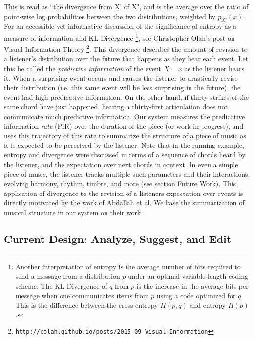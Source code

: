 \documentclass[final,authoryear,5p,times,twocolumn]{elsarticle}
\begin{document}
\noindent This is read as ``the divergence from X' of X", and is the average over the ratio of point-wise log probabilities between the two distributions, weighted by $p_{X'}(x)$. For an accessible yet informative discussion of the significance of entropy as a measure of information and KL Divergence  \footnote{Another interpretation of entropy is the average number of bits required to send a message from a distribution $p$ under an optimal variable-length coding scheme. The KL Divergence of $q$ from $p$ is the increase in the average bits per message when one communicates items from $p$ using a code optimized for $q$. This is the difference between the cross entropy $H(p,q)$ and entropy $H(p)$.}, see Christopher Olah's post on Visual Information Theory \footnote{\texttt{http://colah.github.io/posts/2015-09-Visual-Information}}. This divergence describes the amount of revision to a listener's distribution over the future that happens as they hear each event. Let this be called the \textit{predictive information} of the event $X=x$ as the listener hears it. When a surprising event occurs and causes the listener to drastically revise their distribution (i.e. this same event will be less surprising in the future), the event had high predicative information. On the other hand, if thirty strikes of the same chord have just happened, hearing a thirty-first articulation does not communicate much predictive information. Our system measures the predicative information \textit{rate} (PIR) over the duration of the piece (or work-in-progress), and uses this trajectory of this rate to summarize the structure of a piece of music as it is expected to be perceived by the listener. Note that in the running example, entropy and divergence were discussed in terms of a sequence of chords heard by the listener, and the expectation over next chords in context. In even a simple piece of music, the listener tracks multiple such parameters and their interactions: evolving harmony, rhythm, timbre, and more (see section Future Work). This application of divergence to the revision of a listeners expectation over events is directly motivated by the work of  Abdallah et al. We base the summarization of musical structure in our system on their work.


\subsection{Current Design: Analyze, Suggest, and Edit}

\end{document}
